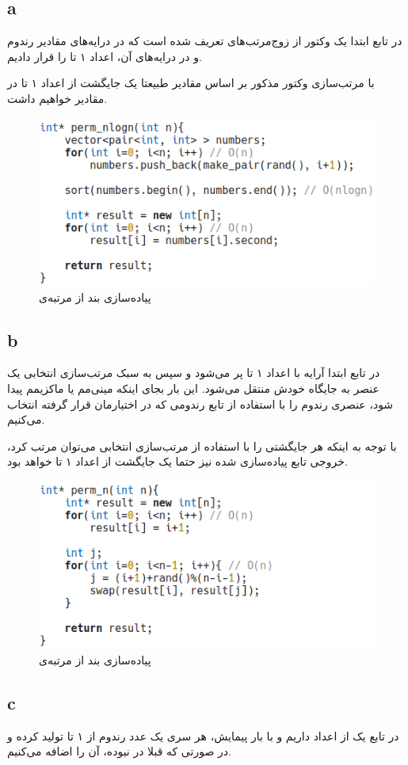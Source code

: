 \documentclass{article}
\begin{document}
\subsection*{a}
در تابع
ابتدا یک وکتور از زوج‌مرتب‌های
تعریف شده است که در درایه‌های
مقادیر رندوم و در درایه‌های
آن، اعداد ۱ تا
را قرار دادیم.

با مرتب‌سازی وکتور مذکور بر اساس مقادیر
طبیعتا یک جایگشت از اعداد ۱ تا
در مقادیر
خواهیم داشت.
\begin{figure}[H]
    \centering
    \includegraphics[width=0.5\linewidth]{Photos/HW2/a.png}
    \caption{
    پیاده‌سازی بند
    از مرتبه‌ی
    }
    \label{fig:my_label}
\end{figure}

\subsection*{b}
در تابع
ابتدا آرایه با اعداد ۱ تا
پر می‌شود و سپس به سبک مرتب‌سازی انتخابی یک عنصر به جایگاه خودش منتقل می‌شود. این بار بجای اینکه مینی‌مم یا ماکزیمم پیدا شود، عنصری رندوم را با استفاده از تابع رندومی که در اختیارمان قرار گرفته انتخاب می‌کنیم.

با توجه به اینکه هر جایگشتی را با استفاده از مرتب‌سازی انتخابی می‌توان مرتب کرد، خروجی تابع پیاده‌سازی شده نیز حتما یک جایگشت از اعداد ۱ تا
خواهد بود.
\begin{figure}[H]
    \centering
    \includegraphics[width=0.5\linewidth]{Photos/HW2/b.png}
    \caption{
    پیاده‌سازی بند
    از مرتبه‌ی
    }
    \label{fig:my_label}
\end{figure}

\subsection*{c}
در تابع
یک
از اعداد داریم و با
بار پیمایش، هر سری یک عدد رندوم از ۱ تا
تولید کرده و در صورتی که قبلا در
نبوده، آن را اضافه می‌کنیم.
\end{document}
